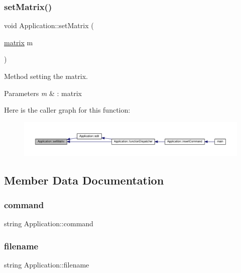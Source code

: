 \subsubsection{\texorpdfstring{set\+Matrix()}{setMatrix()}}
{\footnotesize\ttfamily void Application\+::set\+Matrix (\begin{DoxyParamCaption}\item[{\hyperlink{formula_8h_a869e2a5deeb3daa4c82d6bc91cf20d92}{matrix}}]{m }\end{DoxyParamCaption})}

Method setting the matrix. 
\begin{DoxyParams}{Parameters}
{\em m} & \+: matrix \\
\hline
\end{DoxyParams}
Here is the caller graph for this function\+:
\nopagebreak
\begin{figure}[H]
\begin{center}
\leavevmode
\includegraphics[width=350pt]{class_application_a56b4a55e9eabd40b7f0033ba39631ebe_icgraph}
\end{center}
\end{figure}


\subsection{Member Data Documentation}
\mbox{\label{class_application_acffe56e592fb525ce14ad0437c2c3d34}} 
\subsubsection{\texorpdfstring{command}{command}}
{\footnotesize\ttfamily string Application\+::command\hspace{0.3cm}{\ttfamily [private]}}

\mbox{\label{class_application_a3a20c3178562a91be951369d3356aabd}} 
\subsubsection{\texorpdfstring{filename}{filename}}
{\footnotesize\ttfamily string Application\+::filename\hspace{0.3cm}{\ttfamily [private]}}

